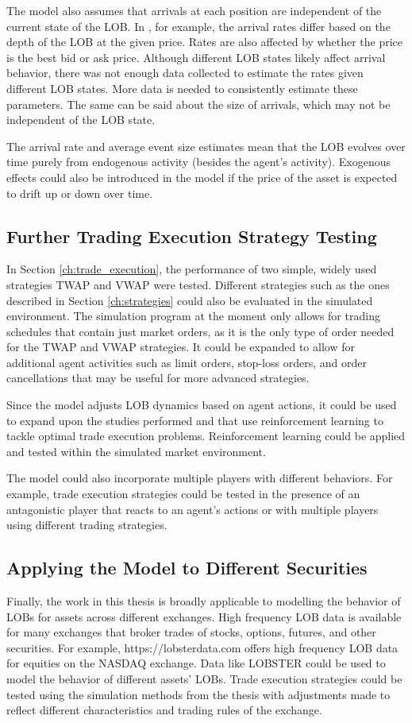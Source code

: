 The model also assumes that arrivals at each position are independent of the current state of the LOB. In \cite{A6}, for example, the arrival rates differ based on the depth of the LOB at the given price. Rates are also affected by whether the price is the best bid or ask price. Although different LOB states likely affect arrival behavior, there was not enough data collected to estimate the rates given different LOB states. More data is needed to consistently estimate these parameters. The same can be said about the size of arrivals, which may not be independent of the LOB state.

The arrival rate and average event size estimates mean that the LOB evolves over time purely from endogenous activity (besides the agent's activity). Exogenous effects could also be introduced in the model if the price of the asset is expected to drift up or down over time. 

\subsection{Further Trading Execution Strategy Testing}
In Section \ref{ch:trade_execution}, the performance of two simple, widely used strategies TWAP and VWAP were tested. Different strategies such as the ones described in Section \ref{ch:strategies} could also be evaluated in the simulated environment. The simulation program at the moment only allows for trading schedules that contain just market orders, as it is the only type of order needed for the TWAP and VWAP strategies. It could be expanded to allow for additional agent activities such as limit orders, stop-loss orders, and order cancellations that may be useful for more advanced strategies. 

Since the model adjusts LOB dynamics based on agent actions, it could be used to expand upon the studies performed \cite{A3} and \cite{A4} that use reinforcement learning to tackle optimal trade execution problems. Reinforcement learning could be applied and tested within the simulated market environment. 

The model could also incorporate multiple players with different behaviors. For example, trade execution strategies could be tested in the presence of an antagonistic player that reacts to an agent's actions or with multiple players using different trading strategies.

\subsection{Applying the Model to Different Securities}
Finally, the work in this thesis is broadly applicable to modelling the behavior of LOBs for assets across different exchanges. High frequency LOB data is available for many exchanges that broker trades of stocks, options, futures, and other securities. For example, https://lobsterdata.com offers high frequency LOB data for equities on the NASDAQ exchange. Data like LOBSTER could be used to model the behavior of different assets' LOBs. Trade execution strategies could be tested using the simulation methods from the thesis with adjustments made to reflect different characteristics and trading rules of the exchange.